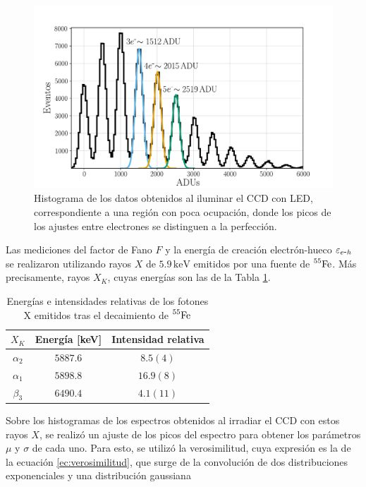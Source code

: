 \begin{figure}[H]
    \centering
        \includegraphics[scale=0.5]{Figs/ajuste_gaussiano_calibracion.pdf}
    \caption{\footnotesize{Histograma de los datos obtenidos al iluminar el CCD con LED, correspondiente a una región con poca ocupación, donde los picos de los ajustes entre electrones se distinguen a la perfección.}}
    \label{fig:Calibracion}
\end{figure}
Las mediciones del factor de Fano $F$ y la energía de creación electrón-hueco $\varepsilon_{e\mbox{-}h}$ se realizaron utilizando rayos $X$ de $5.9\,\si{\mbox{keV}}$ emitidos por una fuente de $\prescript{55}{}{\mbox{Fe}}$. Más precisamente, rayos $X_{K}$, cuyas energías son las de la Tabla \ref{tab:EnergiasXk}.
\begin{table}[h]
\centering
\begin{tabular}{@{}ccc@{}}
\toprule
$X_{K}$         &   Energía [keV]   &   Intensidad relativa \\ \hline \hline
$\alpha_{2}$    &   $5887.6$        &   $8.5 (4)$           \\
$\alpha_{1}$    &   $5898.8$        &   $16.9 (8)$          \\
$\beta_{3}$     &   $6490.4$        &   $4.1 (11)$          \\ \bottomrule
\end{tabular}
\caption{\footnotesize{Energías e intensidades relativas de los fotones X emitidos tras el decaimiento de $\prescript{55}{}{\mbox{Fe}}$}}
\label{tab:EnergiasXk}
\end{table}
Sobre los histogramas de los espectros obtenidos al irradiar el CCD con estos rayos $X$, se realizó un ajuste de los picos del espectro para obtener los parámetros $\mu$ y $\sigma$ de cada uno. Para esto, se utilizó la verosimilitud, cuya expresión es la de la ecuación \eqref{ec:verosimilitud}, que surge de la convolución de dos distribuciones exponenciales y una distribución gaussiana
